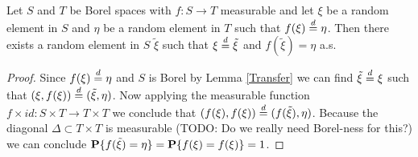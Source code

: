 \begin{lem}\label{SolvingStochasticEquations}Let $S$ and $T$ be Borel spaces with $f : S \to T$
  measurable and let $\xi$ be a random
  element in $S$ and $\eta$ be a random element in $T$ such that
  $f(\xi) \overset{d}= \eta$.  Then there exists a random element in $S$
  $\tilde{\xi}$ such that $\xi \overset{d}= \tilde{\xi}$ and $f(\tilde{\xi}) = \eta$ a.s.
\end{lem}
\begin{proof}
Since $f(\xi) \overset{d}= \eta$ and $S$ is Borel by Lemma \ref{Transfer}
we can find $\tilde{\xi} \overset{d}= \xi$ such that $(\xi, f(\xi)) \overset{d}=
(\tilde{\xi}, \eta)$.  Now applying the measurable function $f \times
id : S \times T \to T \times T$ we conclude that $(f(\xi), f(\xi))
\overset{d}= (f(\tilde{\xi}), \eta)$.  Because the diagonal $\Delta \subset
T \times T$ is measurable (TODO: Do we really need Borel-ness for
this?) we can conclude $\textbf{P}\{f(\tilde{\xi}) = \eta\} =
\textbf{P}\{f(\xi) = f(\xi)\} =1$.
\end{proof}


